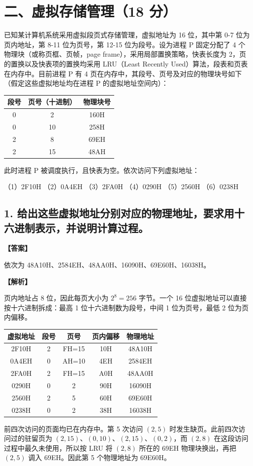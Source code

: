 \documentclass[UTF8,12pt]{ctexart}
\newenvironment{explanation}{\par\noindent\textbf{【解析】}\par\smallskip}{\par\medskip}
\newenvironment{answer}{\par\noindent\textbf{【答案】}\par\smallskip}{\par}
\begin{document}
\section*{二、虚拟存储管理（18 分）}
已知某计算机系统采用虚拟段页式存储管理，虚拟地址为 16 位，其中第 0-7 位为页内地址，第 8-11 位为页号，第 12-15 位为段号。设为进程 P 固定分配了 4 个物理块（或称页框、页帧，page frame），采用局部置换策略，快表长度为 2，页的置换以及快表项的置换均采用 LRU（Least Recently Used）算法，段表和页表在内存中。目前进程 P 有 4 页在内存中，其段号、页号及对应的物理块号如下（假定这些虚拟地址均在进程 P 的虚拟地址空间内）：

\begin{center}
\begin{tabular}{ccc}
\toprule
段号 & 页号（十进制） & 物理块号\\
\midrule
0 & 2 & 160H\\
0 & 10 & 258H\\
2 & 8 & 69EH\\
2 & 15 & 48AH\\
\bottomrule
\end{tabular}
\end{center}

此时进程 P 被调度执行，且快表为空。依次访问下列虚拟地址：

（1）2F10H （2）0A4EH （3）2FA0H （4）0290H （5）2560H （6）0238H

\subsection*{1. 给出这些虚拟地址分别对应的物理地址，要求用十六进制表示，并说明计算过程。}
\begin{answer}
依次为 48A10H、2584EH、48AA0H、16090H、69E60H、16038H。
\end{answer}

\begin{explanation}
页内地址占 8 位，因此每页大小为 $2^8=256$ 字节。一个 16 位虚拟地址可以直接按十六进制拆成：最高 1 位十六进制数为段号，中间 1 位为页号，最低 2 位为页内偏移。

\begin{center}
\begin{tabular}{ccccc}
\toprule
虚拟地址 & 段号 & 页号 & 页内偏移 & 物理地址\\
\midrule
2F10H & 2 & FH=15 & 10H & 48A10H\\
0A4EH & 0 & AH=10 & 4EH & 2584EH\\
2FA0H & 2 & FH=15 & A0H & 48AA0H\\
0290H & 0 & 2 & 90H & 16090H\\
2560H & 2 & 5 & 60H & 69E60H\\
0238H & 0 & 2 & 38H & 16038H\\
\bottomrule
\end{tabular}
\end{center}

前四次访问的页面均已在内存中。第 5 次访问 $(2,5)$ 时发生缺页。此前四次访问过的驻留页为 $(2,15)$、$(0,10)$、$(2,15)$、$(0,2)$，而 $(2,8)$ 在这段访问过程中最久未使用，所以按 LRU 将 $(2,8)$ 所在的 69EH 物理块换出，再把 $(2,5)$ 调入 69EH。因此第 5 个物理地址为 69E60H。
\end{explanation}
\end{document}
